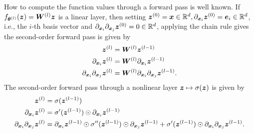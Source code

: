 How to compute the function values through a forward pass is well known.
If $f_{\vtheta^{(l)}}(\vz) = \mW^{(l)} \vz %
$ is a linear layer, then setting ${\bm{z}}^{(0)} = {\bm{x}}\in\mathbb R^d, \partial_{{\bm{x}}_i}{\bm{z}}^{(0)} = {\bm{e}}_i\in\mathbb R^d$, i.e., the $i$-th basis vector and $\partial_{{\bm{x}}_i}\partial_{{\bm{x}}_j}{\bm{z}}^{(0)} = 0\in\mathbb R^d$, applying the chain rule gives the second-order forward pass is given by
\begin{subequations}\label{eq:forward_pass}
    \begin{align}
    \vz^{(l)} & = \mW^{(l)} \vz^{(l-1)} %
    \\
    \partial_{\vx_i} \vz^{(l)} & = \mW^{(l)} \partial_{\vx_i} \vz^{(l-1)} \\
    \partial_{\vx_i}\partial_{\vx_j} \vz^{(l)} & = \mW^{(l)} \partial_{\vx_i}\partial_{\vx_j} \vz^{(l-1)} \label{subeq:secondOrderForward-LinearLayer}.
\end{align}
\end{subequations}
The second-order forward pass through a nonlinear layer ${\bm{z}}\mapsto \sigma({\bm{z}})$ is given by
\begin{subequations}
    \begin{align}
    {\bm{z}}^{(l)} & = \sigma({\bm{z}}^{(l-1)}) \\
    \partial_{{\bm{x}}_i} {\bm{z}}^{(l)} & = \sigma'({\bm{z}}^{(l-1)}) \odot \partial_{{\bm{x}}_i} {\bm{z}}^{(l-1)} \\
    \partial_{{\bm{x}}_i}\partial_{{\bm{x}}_j} {\bm{z}}^{(l)} & = \partial_{{\bm{x}}_i} {\bm{z}}^{(l-1)} \odot \sigma''({\bm{z}}^{(l-1)}) \odot \partial_{{\bm{x}}_j} {\bm{z}}^{(l-1)} + \sigma'({\bm{z}}^{(l-1)}) \odot \partial_{{\bm{x}}_i} \partial_{{\bm{x}}_j} {\bm{z}}^{(l-1)} \label{subeq:secondOrderForward-nonlinearLayer}.
\end{align}
\end{subequations}

